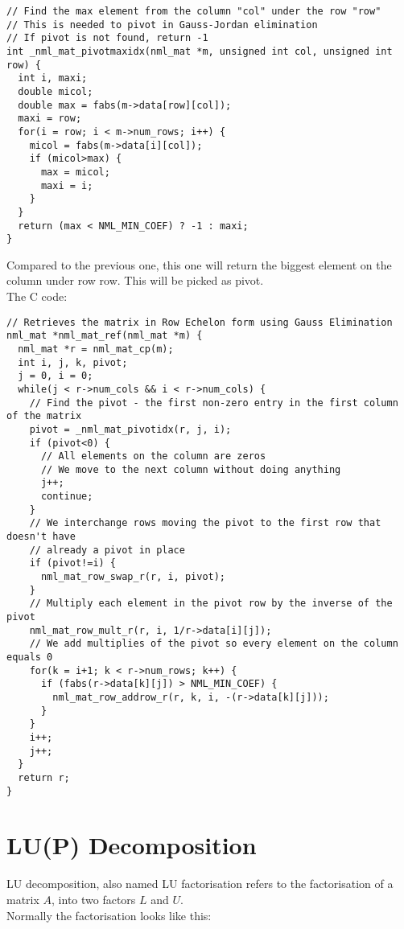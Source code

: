 \begin{verbatim}
// Find the max element from the column "col" under the row "row"
// This is needed to pivot in Gauss-Jordan elimination
// If pivot is not found, return -1
int _nml_mat_pivotmaxidx(nml_mat *m, unsigned int col, unsigned int row) {
  int i, maxi;
  double micol;
  double max = fabs(m->data[row][col]);
  maxi = row;
  for(i = row; i < m->num_rows; i++) {
    micol = fabs(m->data[i][col]);
    if (micol>max) {
      max = micol;
      maxi = i;
    }
  }
  return (max < NML_MIN_COEF) ? -1 : maxi;
} 
\end{verbatim}

Compared to the previous one, this one will return the biggest element on the column under row row. This will be picked as pivot.
\\

The C code:

\begin{verbatim}
// Retrieves the matrix in Row Echelon form using Gauss Elimination
nml_mat *nml_mat_ref(nml_mat *m) {
  nml_mat *r = nml_mat_cp(m);
  int i, j, k, pivot;
  j = 0, i = 0;
  while(j < r->num_cols && i < r->num_cols) {
    // Find the pivot - the first non-zero entry in the first column of the matrix
    pivot = _nml_mat_pivotidx(r, j, i);
    if (pivot<0) {
      // All elements on the column are zeros
      // We move to the next column without doing anything
      j++;
      continue;
    }
    // We interchange rows moving the pivot to the first row that doesn't have
    // already a pivot in place
    if (pivot!=i) {
      nml_mat_row_swap_r(r, i, pivot);
    }
    // Multiply each element in the pivot row by the inverse of the pivot
    nml_mat_row_mult_r(r, i, 1/r->data[i][j]);
    // We add multiplies of the pivot so every element on the column equals 0
    for(k = i+1; k < r->num_rows; k++) {
      if (fabs(r->data[k][j]) > NML_MIN_COEF) {
        nml_mat_row_addrow_r(r, k, i, -(r->data[k][j]));
      } 
    }
    i++;
    j++;
  }
  return r;
} 
\end{verbatim}

\section{LU(P) Decomposition}

LU decomposition, also named LU factorisation refers to the factorisation of a matrix $A$, into two factors $L$ and $U$.
\\

Normally the factorisation looks like this:

